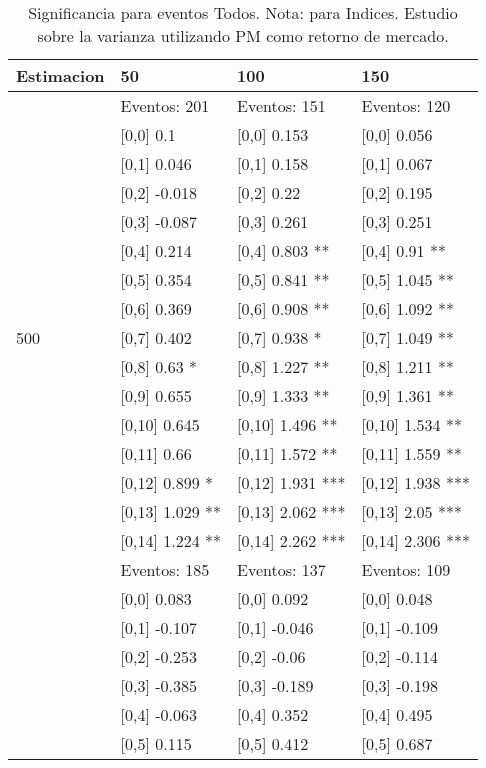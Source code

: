 \begin{table}

\caption{Significancia para eventos Todos. Nota: para Indices. Estudio sobre la varianza utilizando PM como retorno de mercado.}
\centering
\begin{tabular}[t]{llll}
\toprule
Estimacion & 50 & 100 & 150\\
\midrule
 & Eventos:  201 & Eventos:  151 & Eventos:  120\\
 & {}[0,0] 0.1 & {}[0,0] 0.153 & {}[0,0] 0.056\\
 & {}[0,1] 0.046 & {}[0,1] 0.158 & {}[0,1] 0.067\\
 & {}[0,2] -0.018 & {}[0,2] 0.22 & {}[0,2] 0.195\\
 & {}[0,3] -0.087 & {}[0,3] 0.261 & {}[0,3] 0.251\\
\addlinespace
 & {}[0,4] 0.214 & {}[0,4] 0.803 ** & {}[0,4] 0.91 **\\
 & {}[0,5] 0.354 & {}[0,5] 0.841 ** & {}[0,5] 1.045 **\\
 & {}[0,6] 0.369 & {}[0,6] 0.908 ** & {}[0,6] 1.092 **\\
500 & {}[0,7] 0.402 & {}[0,7] 0.938 * & {}[0,7] 1.049 **\\
 & {}[0,8] 0.63 * & {}[0,8] 1.227 ** & {}[0,8] 1.211 **\\
\addlinespace
 & {}[0,9] 0.655 & {}[0,9] 1.333 ** & {}[0,9] 1.361 **\\
 & {}[0,10] 0.645 & {}[0,10] 1.496 ** & {}[0,10] 1.534 **\\
 & {}[0,11] 0.66 & {}[0,11] 1.572 ** & {}[0,11] 1.559 **\\
 & {}[0,12] 0.899 * & {}[0,12] 1.931 *** & {}[0,12] 1.938 ***\\
 & {}[0,13] 1.029 ** & {}[0,13] 2.062 *** & {}[0,13] 2.05 ***\\
\addlinespace
 & {}[0,14] 1.224 ** & {}[0,14] 2.262 *** & {}[0,14] 2.306 ***\\
 & Eventos:  185 & Eventos:  137 & Eventos:  109\\
 & {}[0,0] 0.083 & {}[0,0] 0.092 & {}[0,0] 0.048\\
 & {}[0,1] -0.107 & {}[0,1] -0.046 & {}[0,1] -0.109\\
 & {}[0,2] -0.253 & {}[0,2] -0.06 & {}[0,2] -0.114\\
\addlinespace
 & {}[0,3] -0.385 & {}[0,3] -0.189 & {}[0,3] -0.198\\
 & {}[0,4] -0.063 & {}[0,4] 0.352 & {}[0,4] 0.495\\
 & {}[0,5] 0.115 & {}[0,5] 0.412 & {}[0,5] 0.687\\

\end{tabular}
\end{table}
